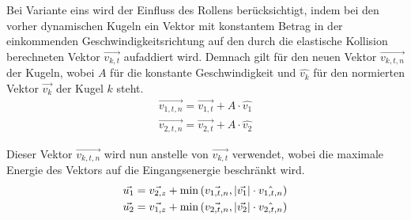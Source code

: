 Bei Variante eins wird der Einfluss des Rollens berücksichtigt,
indem bei den vorher dynamischen Kugeln ein Vektor mit konstantem
Betrag in der einkommenden Geschwindigkeitsrichtung auf den durch die elastische Kollision berechneten Vektor
$\vec{v_{k,t}}$ aufaddiert wird. Demnach gilt für den neuen Vektor $\vec{v_{k,t,n}}$ der Kugeln, wobei $A$ für die konstante Geschwindigkeit und
$\hat{v_k}$ für den normierten Vektor $\vec{v_k}$ der Kugel $k$ steht.
\begin{align}
    \vec{v_{1,t,n}} = \vec{v_{1,t}} + A \cdot \hat{v_1}\\
    \vec{v_{2,t,n}} = \vec{v_{2,t}} + A \cdot \hat{v_2}
\end{align}

Dieser Vektor $\vec{v_{k,t,n}}$ wird nun anstelle von $\vec{v_{k,t}}$ verwendet, wobei die maximale Energie des Vektors
auf die Eingangsenergie beschränkt wird.
\begin{align}
    \vec{u_1} = \vec{v_{2,z}} + \min{(\vec{v_{1,t,n}}, \lvert \vec{v_1} \rvert \cdot \hat{{v_{1,t,n}}})}\\
    \vec{u_2} = \vec{v_{1,z}} + \min{(\vec{v_{2,t,n}}, \lvert \vec{v_2} \rvert \cdot \hat{v_{2,t,n}})}
\end{align}

